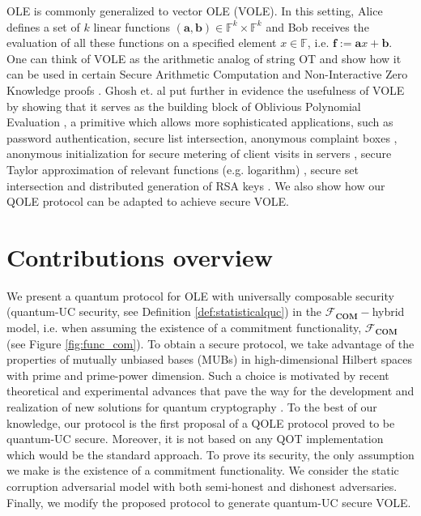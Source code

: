 OLE is commonly generalized to vector OLE (VOLE). In this setting, Alice defines a set of $k$ linear functions $(\bm{a}, \bm{b})\in\mathbb{F}^k\times\mathbb{F}^k$ and Bob receives the evaluation of all these functions on a specified element $x\in\mathbb{F}$, i.e. $\bm{f}:=\bm{a} x+ \bm{b}$. One can think of VOLE as the arithmetic analog of string OT and show how it can be used  in certain Secure Arithmetic Computation and Non-Interactive Zero Knowledge proofs \cite{BCGI18}. Ghosh et. al  put further in evidence the usefulness of VOLE by showing that it serves as the building block of Oblivious Polynomial Evaluation \cite{GNN17}, a primitive which allows more sophisticated applications, such as password authentication, secure  list intersection,  anonymous complaint boxes \cite{NP06}, anonymous initialization for secure metering of client visits in servers \cite{NP99},  secure Taylor approximation of relevant functions (e.g. logarithm) \cite{LP02}, secure set intersection \cite{H18} and distributed generation of RSA keys \cite{G99}.  We also show how our QOLE protocol can be adapted to achieve secure VOLE.

\section{Contributions overview}\label{Intro_contributions}

We present a quantum protocol for OLE with universally composable security (quantum-UC security, see Definition \ref{def:statisticalquc}) in the $\mathcal{F}_{\textbf{COM}}-$hybrid model, i.e. when assuming the existence of a commitment functionality, $\mathcal{F}_{\textbf{COM}}$ (see Figure \ref{fig:func_com}). To obtain a secure protocol, we take advantage of the properties of mutually unbiased bases (MUBs) in high-dimensional Hilbert spaces with prime and prime-power dimension. Such a choice is motivated by recent theoretical and experimental advances that pave the way for the development and realization of new solutions for quantum cryptography \cite{BPT00, CBKG02, AGS03, AKBH07, SS10, DEBZ10, Zhongetal2015, Sitetal17, Bouchardetal18, BHVBFHM18, DHMPPV21}. To the best of our knowledge, our protocol is the first proposal of a QOLE protocol proved to be quantum-UC secure. Moreover, it is not based on any QOT implementation which would be the standard approach. To prove its security, the only assumption we make is the existence of a commitment functionality. We consider the static corruption adversarial model with both semi-honest and dishonest adversaries. Finally, we modify the proposed protocol to generate quantum-UC secure VOLE.


